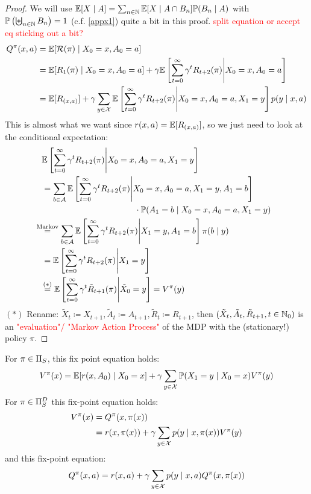 \begin{proof} We will use \(\mathbb{E}[X\mid A]=\sum_{n\in\mathbb{N}} \mathbb{E}[X\mid A \cap B_n] \mathbb{P}(B_n \mid A) \) with \({\mathbb{P}\left(\biguplus_{n\in\mathbb{N}}B_n\right)=1 }\) (c.f. \ref{appx1}) quite a bit in this proof.
\textcolor{red}{split equation or accept eq sticking out a bit?}
\begin{align*}
Q^\pi(x,a) &= \mathbb{E}[\mathcal{R}(\pi)\mid X_0=x, A_0=a]\\
&=\mathbb{E}[R_1(\pi)\mid X_0=x,A_0=a]+\gamma\mathbb{E}\left[\sum_{t=0}^\infty\gamma^t R_{t+2}(\pi)\middle| X_0=x,A_0=a\right]\\
&=\mathbb{E}[R_{(x,a)}] 
 + \gamma \sum_{y\in\mathcal{X}}\mathbb{E}\left[\sum_{t=0}^\infty\gamma^t R_{t+2}(\pi) \middle| X_0=x,A_0=a, X_1=y\right]p(y\mid x, a)\\
\end{align*}
This is almost what we want since \(r(x,a)=\mathbb{E}[R_{(x,a)}] \), so we just need to look at the conditional expectation:
\begin{align*}
	&\E\left[\sum_{t=0}^\infty\gamma^t R_{t+2}(\pi) \middle| X_0=x,A_0=a, X_1=y\right]\\
	&=\sum_{b\in\cA}
	\begin{aligned}[t]
	&\E\left[\sum_{t=0}^\infty\gamma^t R_{t+2}(\pi) 
	\middle| X_0=x,A_0=a, X_1=y,A_1=b \right]\\
	&\qquad\qquad\qquad\qquad\cdot \Pr(A_1=b \mid X_0=x,A_0=a, X_1=y) 
	\end{aligned}
	\\
	&\lxeq{\text{Markov}} \sum_{b\in\cA}\E\left[\sum_{t=0}^\infty\gamma^t R_{t+2}(\pi) \middle| X_1=y,A_1=b \right]
	\pi(b\mid y)\\
	&= \E\left[\sum_{t=0}^\infty\gamma^t R_{t+2}(\pi)\middle| X_1=y \right] \\
 	&\lxeq{(*)} \E\left[\sum_{t=0}^\infty\gamma^t \tilde{R}_{t+1}(\pi)\middle| \tilde{X}_0=y \right]=V^\pi(y)
\end{align*}
\((*)\) Rename: \(\tilde{X}_{t}\coloneqq X_{t+1}, \tilde{A}_t\coloneqq A_{t+1},\tilde{R}_{t}\coloneqq R_{t+1}\), then \((\tilde{X}_t,\tilde{A}_t,\tilde{R}_{t+1}, t\in\mathbb{N}_0)\) is an \textcolor{red}{"evaluation"/ "Markov Action Process"} of the MDP with the (stationary!) policy \(\pi\).
\end{proof}

\begin{corollary}\label{V^pi,Q^pi relation} 
For \(\pi\in\Pi_S\), this fix point equation holds:
\[
	V^\pi(x) = \mathbb{E}[r(x,A_0)\mid X_0=x] 
	+ \gamma \sum_{y\in\mathcal{X}} \mathbb{P}(X_1=y \mid X_0=x) V^\pi(y)
\]	
For \(\pi\in\Pi_S^D\) this fix-point equation holds: 
\begin{align*}
	V^\pi(x)&=Q^\pi(x,\pi(x))\\
	 &=r(x,\pi(x))+\gamma\sum\limits_{y\in\mathcal{X}}p(y\mid x,\pi(x))V^\pi(y)
\end{align*}
and this fix-point equation:
\[
	Q^\pi(x,a)=r(x,a)+\gamma\sum_{y\in\mathcal{X}}p(y\mid x,a)Q^\pi(x,\pi(x))
\]
\end{corollary}

